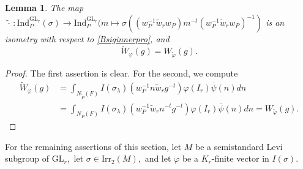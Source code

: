 \documentclass[12pt]{amsart}
\newtheorem{lem}[thm]{Lemma}
\theoremstyle{remark}
\numberwithin{equation}{section}
\newcommand{\GL}{\mathrm{GL}}
\theoremstyle{definition}
\numberwithin{equation}{subsection}
\begin{document}
\begin{lem} \label{lem:duals}
    The map $\widetilde{\,\cdot\, }:\mathrm{Ind}_{P}^{\GL_r}(\sigma) \to \mathrm{Ind}_P^{\GL_r}(m \mapsto \sigma((w_P^{-1} \widetilde{w}_rw_P)m^{-t}(w_P^{-1} \widetilde{w}_rw_P)^{-1})$ is an isometry with respect to \eqref{Bsiginnerpro}, and 
    $$
    \widetilde{W}_{\varphi}(g)=W_{\widetilde{\varphi}}(g).
    $$
\end{lem}
\begin{proof}
The first assertion is clear. 
 For the second, we compute
\begin{align*}
    \widetilde{W}_{\varphi}(g)&=\int_{N_{\overleftarrow{P}}(F)}I(\sigma_\lambda)\left(w_P^{-1}n\widetilde{w}_rg^{-t}\right)\varphi(I_r) \overline{\psi}(n)dn\\
    &=\int_{N_{\overline{P}}(F)}I(\sigma_\lambda)\left(w_P^{-1}\widetilde{w}_rn^{-t}g^{-t}\right)\varphi(I_r) \overline{\psi}(n)dn
    =W_{\widetilde{\varphi}}(g).
\end{align*}
\end{proof}




For the remaining assertions of this section, let $M$ be a semistandard Levi subgroup of $\GL_r,$ let $\sigma \in \mathrm{Irr}_2(M),$ and let $\varphi$ be a $K_r$-finite vector in $I(\sigma).$
\end{document}
